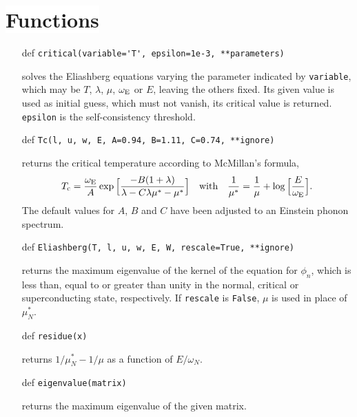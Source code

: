 \documentclass[a4paper]{article}
\def\sub#1{\sb{\mathrm{#1}}}
\def\headline#1{\section*{\normalsize\normalfont%
   \rlap{\rule[0.5ex]{\textwidth}{0.4pt}}\qquad\colorbox{white}{#1}}}
\begin{document}
   \headline{Functions}

   \begin{itemize}
      \item[def] \verb|critical(variable='T', epsilon=1e-3, **parameters)|

      solves the Eliashberg equations varying the parameter indicated by
      \verb|variable|, which may be $T$, $\lambda$, $\mu$, $\omega \sub E$ or
      $E$, leaving the others fixed. Its given value is used as initial guess,
      which must not vanish, its critical value is returned. \verb|epsilon| is
      the self-consistency threshold.

      \item[def] \verb|Tc(l, u, w, E, A=0.94, B=1.11, C=0.74, **ignore)|

      returns the critical temperature according to McMillan's formula,
      \begin{equation*}
         T \sub c = \frac {\omega \sub E} A \exp
         \Big[ \frac{-B (1 + \lambda)}{\lambda - C \lambda \mu^* - \mu^*} \Big]
         \quad \text{with} \quad
         \frac 1 {\mu^*} =
         \frac 1 \mu + \log \Big[ \frac E {\omega \sub E} \Big].
      \end{equation*}
      The default values for $A$, $B$ and $C$ have been adjusted to an Einstein
      phonon spectrum.

      \item[def] \verb|Eliashberg(T, l, u, w, E, W, rescale=True, **ignore)|

      returns the maximum eigenvalue of the kernel of the equation for $\phi_n$,
      which is less than, equal to or greater than unity in the normal, critical
      or superconducting state, respectively. If \verb|rescale| is \verb|False|,
      $\mu$ is used in place of $\mu^*_N$.

      \item[def] \verb|residue(x)|

      returns $1 / \mu^*_N - 1 / \mu$ as a function of $E / \omega_N$.

      \item[def] \verb|eigenvalue(matrix)|

      returns the maximum eigenvalue of the given matrix.
   \end{itemize}
\end{document}
